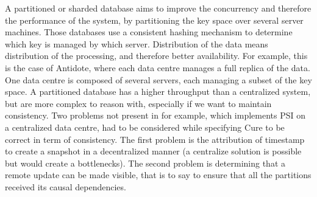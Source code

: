 \documentclass[11pt]{article}
\begin{document}
A partitioned or sharded database aims to improve the concurrency and
therefore the performance of the system, by partitioning the key space over
several server machines. Those databases use a consistent hashing mechanism to
determine which key is managed by which server. Distribution of the data means
distribution of the processing, and therefore better availability. For
example, this is the case of Antidote, where each data centre manages a full
replica of the data. One data centre is composed of several servers, each
managing a subset of the key space. A partitioned database has a higher
throughput than a centralized system, but are more complex to reason with,
especially if we want to maintain consistency. Two problems not present in
\cite{Sovran2011} for example, which implements PSI on a centralized data
centre, had to be considered while specifying Cure to be correct in term of
consistency. The first problem is the attribution of timestamp to create a
snapshot in a decentralized manner (a centralize solution is possible but
would create a bottlenecks). The second problem is determining that a remote
update can be made visible, that is to say to ensure that all the partitions
received its causal dependencies.
\end{document}
